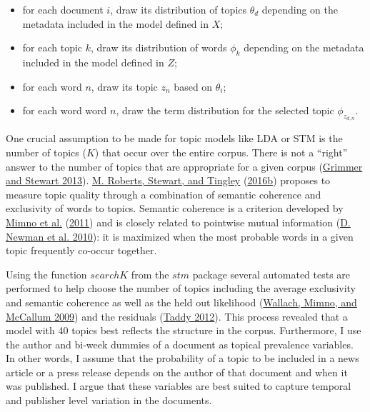 \documentclass[
]{article}
\providecommand{\tightlist}{%
  \setlength{\itemsep}{0pt}\setlength{\parskip}{0pt}}
\begin{document}
\begin{itemize}
\tightlist
\item
  for each document \(i\), draw its distribution of topics \(\theta_d\)
  depending on the metadata included in the model defined in \(X\);
\item
  for each topic \(k\), draw its distribution of words \(\phi_k\)
  depending on the metadata included in the model defined in \(Z\);
\item
  for each word \(n\), draw its topic \(z_n\) based on \(\theta_i\);
\item
  for each word word \(n\), draw the term distribution for the selected
  topic \(\phi_{z_{d,n}}\).
\end{itemize}

One crucial assumption to be made for topic models like LDA or STM is
the number of topics (\(K\)) that occur over the entire corpus. There is
not a ``right'' answer to the number of topics that are appropriate for
a given corpus (\protect\hyperlink{ref-grimmer_text_2013}{Grimmer and
Stewart 2013}). \protect\hyperlink{ref-roberts_stm:_2016}{M. Roberts,
Stewart, and Tingley} (\protect\hyperlink{ref-roberts_stm:_2016}{2016b})
proposes to measure topic quality through a combination of semantic
coherence and exclusivity of words to topics. Semantic coherence is a
criterion developed by
\protect\hyperlink{ref-mimno_optimizing_2011}{Mimno et al.}
(\protect\hyperlink{ref-mimno_optimizing_2011}{2011}) and is closely
related to pointwise mutual information
(\protect\hyperlink{ref-newman_automatic_2010}{D. Newman et al. 2010}):
it is maximized when the most probable words in a given topic frequently
co-occur together.

Using the function \(searchK\) from the \(stm\) package several
automated tests are performed to help choose the number of topics
including the average exclusivity and semantic coherence as well as the
held out likelihood
(\protect\hyperlink{ref-wallach_rethinking_2009}{Wallach, Mimno, and
McCallum 2009}) and the residuals
(\protect\hyperlink{ref-taddy_estimation_2012}{Taddy 2012}). This
process revealed that a model with 40 topics best reflects the structure
in the corpus. Furthermore, I use the author and bi-week dummies of a
document as topical prevalence variables. In other words, I assume that
the probability of a topic to be included in a news article or a press
release depends on the author of that document and when it was
published. I argue that these variables are best suited to capture
temporal and publisher level variation in the documents.
\end{document}
